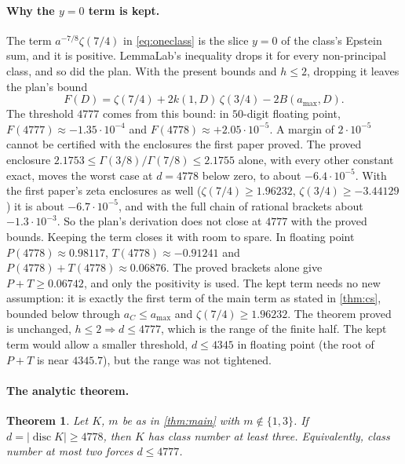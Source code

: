 \documentclass[11pt]{article}
\newtheorem{theorem}{Theorem}[section]
\theoremstyle{definition}
\newcommand{\disc}{\operatorname{disc}}
\begin{document}
{\paragraph{Why the $y = 0$ term is kept.}\label{sec:yzero} The term $a^{-7/8}\zeta(7/4)$ in \eqref{eq:oneclass} is the slice $y = 0$ of the class's Epstein sum, and it is positive. LemmaLab's inequality drops it for every non-principal class, and so did the plan. With the present bounds and $h \le 2$, dropping it leaves the plan's bound
\[
F(D) = \zeta(7/4) + 2k(1, D)\,\zeta(3/4) - 2B(a_{\max}, D).
\]
The threshold $4777$ comes from this bound: in $50$-digit floating point, $F(4777) \approx -1.35\cdot 10^{-4}$ and $F(4778) \approx +2.05\cdot 10^{-5}$. A margin of $2\cdot 10^{-5}$ cannot be certified with the enclosures the first paper proved. The proved enclosure $2.1753 \le \Gamma(3/8)/\Gamma(7/8) \le 2.1755$ alone, with every other constant exact, moves the worst case at $d = 4778$ below zero, to about $-6.4\cdot 10^{-5}$. With the first paper's zeta enclosures as well ($\zeta(7/4) \ge 1.96232$, $\zeta(3/4) \ge -3.44129$) it is about $-6.7\cdot 10^{-5}$, and with the full chain of rational brackets about $-1.3\cdot 10^{-3}$. So the plan's derivation does not close at $4777$ with the proved bounds. Keeping the term closes it with room to spare. In floating point $P(4778) \approx 0.98117$, $T(4778) \approx -0.91241$ and $P(4778) + T(4778) \approx 0.06876$. The proved brackets alone give $P + T \ge 0.06742$, and only the positivity is used. The kept term needs no new assumption: it is exactly the first term of the main term as stated in \cref{thm:cs}, bounded below through $a_C \le a_{\max}$ and $\zeta(7/4) \ge 1.96232$. The theorem proved is unchanged, $h \le 2 \Rightarrow d \le 4777$, which is the range of the finite half. The kept term would allow a smaller threshold, $d \le 4345$ in floating point (the root of $P + T$ is near $4345.7$), but the range was not tightened.

\paragraph{The analytic theorem.}

\begin{theorem}\label{thm:analytic}
Let $K$, $m$ be as in \cref{thm:main} with $m \notin \{1, 3\}$. If $d = |\disc K| \ge 4778$, then $K$ has class number at least three. Equivalently, class number at most two forces $d \le 4777$.
\end{theorem}

}
\end{document}
